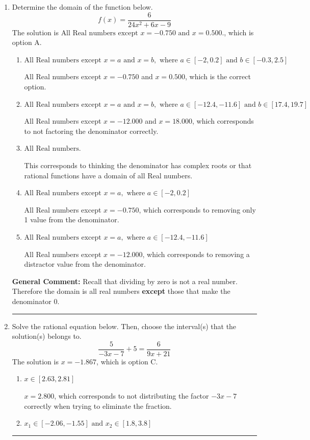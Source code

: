 \documentclass{extbook}[14pt]
\newcommand{\litem}[1]{\item #1

\rule{\textwidth}{0.4pt}}
\begin{document}
\begin{enumerate}\litem{
Determine the domain of the function below.
\[ f(x) = \frac{6}{24x^{2} +6 x -9} \]The solution is \( \text{All Real numbers except } x = -0.750 \text{ and } x = 0.500. \), which is option A.\begin{enumerate}[label=\Alph*.]
\item \( \text{All Real numbers except } x = a \text{ and } x = b, \text{ where } a \in [-2, 0.2] \text{ and } b \in [-0.3, 2.5] \)

All Real numbers except $x = -0.750$ and $x = 0.500$, which is the correct option.
\item \( \text{All Real numbers except } x = a \text{ and } x = b, \text{ where } a \in [-12.4, -11.6] \text{ and } b \in [17.4, 19.7] \)

All Real numbers except $x = -12.000$ and $x = 18.000$, which corresponds to not factoring the denominator correctly.
\item \( \text{All Real numbers.} \)

This corresponds to thinking the denominator has complex roots or that rational functions have a domain of all Real numbers.
\item \( \text{All Real numbers except } x = a, \text{ where } a \in [-2, 0.2] \)

All Real numbers except $x = -0.750$, which corresponds to removing only 1 value from the denominator.
\item \( \text{All Real numbers except } x = a, \text{ where } a \in [-12.4, -11.6] \)

All Real numbers except $x = -12.000$, which corresponds to removing a distractor value from the denominator.
\end{enumerate}

\textbf{General Comment:} Recall that dividing by zero is not a real number. Therefore the domain is all real numbers \textbf{except} those that make the denominator 0.
}
\litem{
Solve the rational equation below. Then, choose the interval(s) that the solution(s) belongs to.
\[ \frac{5}{-3x -7} + 5 = \frac{6}{9x + 21} \]The solution is \( x = -1.867 \), which is option C.\begin{enumerate}[label=\Alph*.]
\item \( x \in [2.63,2.81] \)

$x = 2.800$, which corresponds to not distributing the factor $-3x -7$ correctly when trying to eliminate the fraction.
\item \( x_1 \in [-2.06, -1.55] \text{ and } x_2 \in [1.8,3.8] \)


\end{enumerate}}
\end{enumerate}
\end{document}
